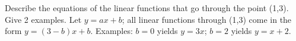 {Describe the equations of the linear functions that go through the point (1,3). Give 2 examples.}
{Let $y = ax+b$; all linear functions through (1,3) come in the form $y = (3-b)x+b$. Examples: $b=0$ yields $y = 3x$; $b=2$ yields $y=x+2$.
}